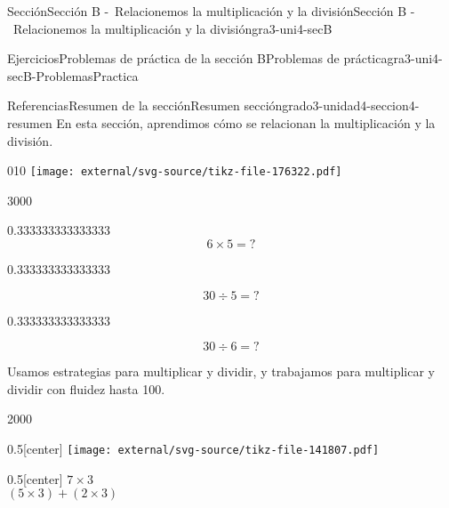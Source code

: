 \documentclass[twoside,10pt,]{article}
\begin{document}
\begin{sectionptx}{Sección}{Sección B -~Relacionemos la multiplicación y la división}{}{Sección B -~Relacionemos la multiplicación y la división}{}{}{gra3-uni4-secB}
\begin{exercises-subsection}{Ejercicios}{Problemas de práctica de la sección B}{}{Problemas de práctica}{}{}{gra3-uni4-secB-ProblemasPractica}
\end{exercises-subsection}
%
%
\typeout{************************************************}
\typeout{************************************************}
%
\begin{references-subsection}{Referencias}{Resumen de la sección}{}{Resumen sección}{}{}{grado3-unidad4-seccion4-resumen}
En esta sección, aprendimos cómo se relacionan la multiplicación y la división.%
\begin{image}{0}{1}{0}{}%
\texttt{[image: external/svg-source/tikz-file-176322.pdf]}
\end{image}%
\begin{sidebyside}{3}{0}{0}{0}%
\begin{sbspanel}{0.333333333333333}%
%
\begin{equation*}
6\times 5={?}
\end{equation*}
%
\end{sbspanel}%
\begin{sbspanel}{0.333333333333333}%
\par
%
\begin{equation*}
30\div 5={?}
\end{equation*}
%
\end{sbspanel}%
\begin{sbspanel}{0.333333333333333}%
\par
%
\begin{equation*}
30\div 6={?}
\end{equation*}
%
\end{sbspanel}%
\end{sidebyside}%
\par
Usamos estrategias para multiplicar y dividir, y trabajamos para multiplicar y dividir con fluidez hasta 100.%
\begin{sidebyside}{2}{0}{0}{0}%
\begin{sbspanel}{0.5}[center]%
\texttt{[image: external/svg-source/tikz-file-141807.pdf]}
\end{sbspanel}%
\begin{sbspanel}{0.5}[center]%
\(7\times 3\)\\
 \((5\times3)+(2\times3)\)%
\end{sbspanel}%
\end{sidebyside}%
\end{references-subsection}
\end{sectionptx}
%
%
\typeout{************************************************}
\end{document}

